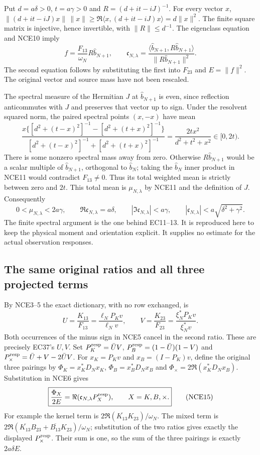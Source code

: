 Put $d=a\delta>0$, $t=a\gamma>0$ and
$R=(d+it-iJ)^{-1}$. For every vector $x$,
$\|(d+it-iJ)x\|\,\|x\|\ge
\Re\langle x,(d+it-iJ)x\rangle=d\|x\|^2$.
The finite square matrix is injective, hence invertible, with
$\|R\|\le d^{-1}$.
The eigenclass equation and NCE10 imply
\[
 f=\frac{F_{13}}{\omega_N}R\widehat b_{N+1},\qquad
 \mathfrak c_{N,\lambda}
  =\frac{\langle\widehat b_{N+1},R\widehat b_{N+1}\rangle}
         {\|R\widehat b_{N+1}\|^2}.
 \tag{NCE11}
\]
The second equation follows by substituting the first into
$F_{23}$ and $E=\|f\|^2$. The original vector and source mass
have not been rescaled.

The spectral measure of the Hermitian $J$ at
$\widehat b_{N+1}$ is even, since reflection anticommutes with
$J$ and preserves that vector up to sign. Under the resolvent
squared norm, the paired spectral points $(x,-x)$ have mean
\[
 \frac{x\{[d^2+(t-x)^2]^{-1}-[d^2+(t+x)^2]^{-1}\}}
 {[d^2+(t-x)^2]^{-1}+[d^2+(t+x)^2]^{-1}}
       =\frac{2tx^2}{d^2+t^2+x^2}\in[0,2t).
 \tag{NCE12}
\]
There is some nonzero spectral mass away from zero. Otherwise
$R\widehat b_{N+1}$ would be a scalar multiple of
$\widehat b_{N+1}$, orthogonal to $\widehat b_N$; taking the
$\widehat b_N$ inner product in NCE11 would contradict
$F_{13}\ne0$.
Thus its total weighted mean is strictly between zero and $2t$.
This total mean is $\mu_{N,\lambda}$ by NCE11 and the definition
of $J$. Consequently
\[
 0<\mu_{N,\lambda}<2a\gamma,\qquad
 \Re\mathfrak c_{N,\lambda}=a\delta,\qquad
 |\Im\mathfrak c_{N,\lambda}|<a\gamma,\qquad
 |\mathfrak c_{N,\lambda}|<a\sqrt{\delta^2+\gamma^2}.
 \tag{NCE13}
\]
The finite spectral argument is the one behind EC11--13. It is
reproduced here to keep the physical moment and orientation explicit.
It supplies no estimate for the actual observation responses.

\subsection{The same original ratios and all three projected terms}

By NCE3--5 the exact dictionary, with no row exchanged, is
\[
 \boxed{\quad
 U=\frac{K_{13}}{F_{13}}
     =\frac{\ell_NP_Kv}{\ell_Nv},\qquad
 V=\frac{K_{23}}{F_{23}}
     =\frac{\xi_N^*P_Kv}{\xi_N^*v}.
 \quad}                                                         \tag{NCE14}
\]
Both occurrences of the minus sign in NCE5 cancel in the second
ratio. These are precisely EC37's $U,V$.
Set
$P_K^{\rm resp}=\bar UV$,
$P_B^{\rm resp}=(1-\bar U)(1-V)$ and
$P_\times^{\rm resp}=\bar U+V-2\bar UV$.
For $x_K=P_Kv$ and $x_B=(I-P_K)v$, define the original three
pairings by
$\Phi_K=x_K^*D_Nx_K$,
$\Phi_B=x_B^*D_Nx_B$ and
$\Phi_\times=2\Re(x_K^*D_Nx_B)$.
Substitution in NCE6 gives
\[
 \boxed{\frac{\Phi_X}{2E}
       =\Re(\mathfrak c_{N,\lambda}P_X^{\rm resp}),
           \qquad X=K,B,\times.}
 \tag{NCE15}
\]
For example the kernel term is
$2\Re(\overline{K_{13}}K_{23})/\omega_N$.
The mixed term is
$2\Re(\overline{K_{13}}B_{23}+\overline{B_{13}}K_{23})/\omega_N$;
substitution of the two ratios gives exactly the displayed
$P_\times^{\rm resp}$. Their sum is one, so the sum of the three
pairings is exactly $2a\delta E$.

